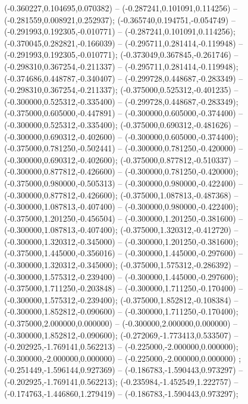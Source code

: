  (-0.360227,0.104695,0.070382) -- (-0.287241,0.101091,0.114256) -- (-0.281559,0.008921,0.252937);
 (-0.365740,0.194751,-0.054749) -- (-0.291993,0.192305,-0.010771) -- (-0.287241,0.101091,0.114256);
 (-0.370045,0.282821,-0.166039) -- (-0.295711,0.281414,-0.119948) -- (-0.291993,0.192305,-0.010771);
 (-0.373049,0.367845,-0.261746) -- (-0.298310,0.367254,-0.211337) -- (-0.295711,0.281414,-0.119948);
 (-0.374686,0.448787,-0.340407) -- (-0.299728,0.448687,-0.283349) -- (-0.298310,0.367254,-0.211337);
 (-0.375000,0.525312,-0.401235) -- (-0.300000,0.525312,-0.335400) -- (-0.299728,0.448687,-0.283349);
 (-0.375000,0.605000,-0.447891) -- (-0.300000,0.605000,-0.374400) -- (-0.300000,0.525312,-0.335400);
 (-0.375000,0.690312,-0.481626) -- (-0.300000,0.690312,-0.402600) -- (-0.300000,0.605000,-0.374400);
 (-0.375000,0.781250,-0.502441) -- (-0.300000,0.781250,-0.420000) -- (-0.300000,0.690312,-0.402600);
 (-0.375000,0.877812,-0.510337) -- (-0.300000,0.877812,-0.426600) -- (-0.300000,0.781250,-0.420000);
 (-0.375000,0.980000,-0.505313) -- (-0.300000,0.980000,-0.422400) -- (-0.300000,0.877812,-0.426600);
 (-0.375000,1.087813,-0.487368) -- (-0.300000,1.087813,-0.407400) -- (-0.300000,0.980000,-0.422400);
 (-0.375000,1.201250,-0.456504) -- (-0.300000,1.201250,-0.381600) -- (-0.300000,1.087813,-0.407400);
 (-0.375000,1.320312,-0.412720) -- (-0.300000,1.320312,-0.345000) -- (-0.300000,1.201250,-0.381600);
 (-0.375000,1.445000,-0.356016) -- (-0.300000,1.445000,-0.297600) -- (-0.300000,1.320312,-0.345000);
 (-0.375000,1.575312,-0.286392) -- (-0.300000,1.575312,-0.239400) -- (-0.300000,1.445000,-0.297600);
 (-0.375000,1.711250,-0.203848) -- (-0.300000,1.711250,-0.170400) -- (-0.300000,1.575312,-0.239400);
 (-0.375000,1.852812,-0.108384) -- (-0.300000,1.852812,-0.090600) -- (-0.300000,1.711250,-0.170400);
 (-0.375000,2.000000,0.000000) -- (-0.300000,2.000000,0.000000) -- (-0.300000,1.852812,-0.090600);
 (-0.272069,-1.773413,0.533507) -- (-0.202925,-1.769141,0.562213) -- (-0.225000,-2.000000,0.000000);
 (-0.300000,-2.000000,0.000000) -- (-0.225000,-2.000000,0.000000) ;
 (-0.251449,-1.596144,0.927369) -- (-0.186783,-1.590443,0.973297) -- (-0.202925,-1.769141,0.562213);
 (-0.235984,-1.452549,1.222757) -- (-0.174763,-1.446860,1.279419) -- (-0.186783,-1.590443,0.973297);
